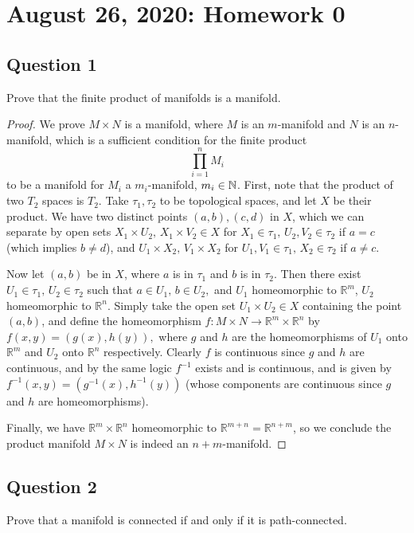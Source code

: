 \section{August 26, 2020: Homework 0}
\subsection{Question 1}
\begin{prob}
    Prove that the finite product of manifolds is a manifold.
\end{prob}
\begin{proof}
    We prove $M \times N$ is a manifold, where $M$ is an $m$-manifold and $N$ is an $n$-manifold, which is a sufficient condition for the finite product 
\[
    \prod_{i=1}^n M_{i}
\]
to be a manifold for $M_i$ a $m_i$-manifold, $m_i \in \mathbb{N}$. First, note that the product of two $T_2$ spaces is $T_2$. Take $\tau_1, \tau_2$ to be topological spaces, and let $X$ be their product. We have two distinct points $(a,b), (c,d)$ in $X$, which we can separate by open sets $X_1 \times U_2, \, X_1 \times V_2 \in X$ for $X_1 \in \tau_1, \, U_2, V_2 \in \tau_2$ if $a = c$ (which implies $b \neq d$), and  $U_1 \times X_2, \, V_1 \times X_2$ for $U_1, V_1 \in \tau_1, \, X_2 \in \tau_2$ if $a \neq c.$ 

Now let $(a,b)$ be in $X$, where $a$ is in $\tau_1$ and $b$ is in $\tau_2.$ Then there exist $U_1 \in \tau_1, \, U_2 \in \tau_2$ such that $a \in U_1, \, b\in U_2,$ and $U_1$ homeomorphic to $\mathbb{R}^m$, $U_2$ homeomorphic to $\mathbb{R}^n.$ Simply take the open set $U_1 \times U_2 \in X$ containing the point $(a,b)$, and define the homeomorphism $f: M \times N \to \mathbb{R}^m \times \mathbb{R}^n$ by  $f(x,y)=(g(x),h(y)),$ where $g$ and $h$ are the homeomorphisms of $U_1$ onto $\mathbb{R}^m$ and $U_2$ onto $\mathbb{R}^n$ respectively. Clearly $f$ is continuous since $g$ and $h$ are continuous, and by the same logic $f^{-1}$ exists and is continuous, and is given by $f^{-1}(x,y) = (g^{-1}(x),h^{-1}(y))$ (whose components are continuous since $g$ and $h$ are homeomorphisms).

Finally, we have $\mathbb{R}^m \times \mathbb{R}^n$ homeomorphic to $\mathbb{R}^{m+n}=\mathbb{R}^{n+m}$, so we conclude the product manifold $M \times N$ is indeed an $n+m$-manifold.
\end{proof}
\vspace{10mm}

\subsection{Question 2}
\begin{prob}
    Prove that a manifold is connected if and only if it is path-connected.
\end{prob}

